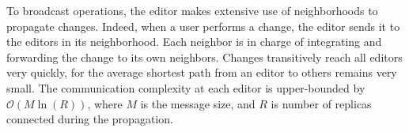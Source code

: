 To broadcast operations, the editor makes extensive use of neighborhoods to
propagate changes. Indeed, when a user performs a change, the editor sends it to
the editors in its neighborhood. Each neighbor is in charge of integrating and
forwarding the change to its own neighbors. Changes transitively reach all
editors very quickly, for the average shortest path from an editor to others
remains very small. The communication complexity at each editor is upper-bounded
by $\mathcal{O}(M \ln(R))$, where $M$ is the message size, and $R$ is number of
replicas connected during the propagation.





